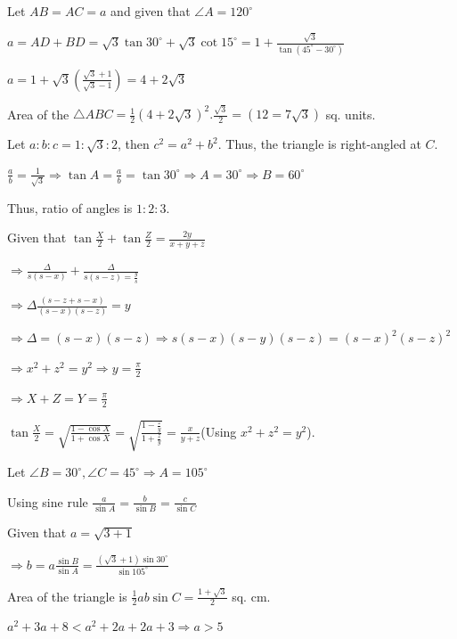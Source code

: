   \startplacefigure
    \externalfigure[17_20.pdf]
  \stopplacefigure

  Let $AB = AC = a$ and given that $\angle A = 120^\circ$

  $a = AD + BD = \sqrt{3}\tan30^\circ + \sqrt{3}\cot15^\circ = 1 + \frac{\sqrt{3}}{\tan(45^\circ -
    30^\circ)}$

  $a = 1 + \sqrt{3}\left(\frac{\sqrt{3} + 1}{\sqrt{3} - 1}\right) = 4 + 2\sqrt{3}$

  Area of the $\triangle ABC = \frac{1}{2}(4 + 2\sqrt{3})^2.\frac{\sqrt{3}}{2} = \left(12 =
  7\sqrt{3}\right)$ sq. units.
\item Let $a:b:c = 1:\sqrt{3}:2$, then $c^2 = a^2 + b^2$. Thus, the triangle is right-angled at $C$.

  $\frac{a}{b} = \frac{1}{\sqrt{3}}\Rightarrow \tan A = \frac{a}{b} = \tan30^\circ \Rightarrow A =
  30^\circ \Rightarrow B = 60^\circ$

  Thus, ratio of angles is $1:2:3$.
\item Given that $\tan\frac{X}{2} + \tan \frac{Z}{2} = \frac{2y}{x + y + z}$

  $\Rightarrow \frac{\Delta}{s(s - x)} + \frac{\Delta}{s(s - z) = \frac{y}{s}}$

  $\Rightarrow \Delta\frac{(s - z + s - x)}{(s - x)(s - z)} = y$

  $\Rightarrow \Delta = (s - x)(s - z)\Rightarrow s(s - x)(s - y)(s - z) = (s - x)^2(s - z)^2$

  $\Rightarrow x^2 + z^2 = y^2 \Rightarrow y = \frac{\pi}{2}$

  $\Rightarrow X + Z = Y = \frac{\pi}{2}$

  $\tan\frac{X}{2} = \sqrt{\frac{1 - \cos X}{1 + \cos X}} = \sqrt{\frac{1 - \frac{z}{y}}{1 + \frac{z}{y}}}
  = \frac{x}{y + z}$(Using $x^2 + z^2 = y^2$).
\item Let $\angle B = 30^\circ, \angle C = 45^\circ \Rightarrow A = 105^\circ$

  Using sine rule $\frac{a}{\sin A} = \frac{b}{\sin B} = \frac{c}{\sin C}$

  Given that $a = \sqrt{3 + 1}$

  $\Rightarrow b = a\frac{\sin B}{\sin A} = \frac{(\sqrt{3} + 1)\sin30^\circ}{\sin105^\circ}$

  Area of the triangle is $\frac{1}{2}ab\sin C = \frac{1 + \sqrt{3}}{2}$ sq. cm.
\item $a^2 + 3a + 8 < a^2 + 2a + 2a + 3 \Rightarrow a > 5$

